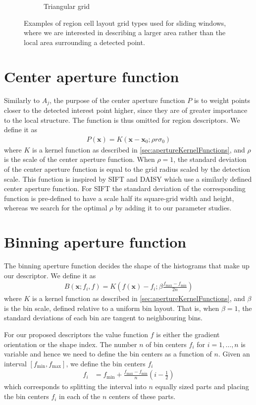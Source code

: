 \documentclass[thesis.tex]{subfiles}
\def\x{\mathbf{x}}
\begin{document}
\begin{figure}[tb]
\begin{subfigure}[t]{0.45\textwidth}
		\caption{Triangular grid}
		\label{fig:gridTypeTriangle}
	\end{subfigure}
	\caption{Examples of region cell layout grid types used for sliding windows, where we are interested in describing a larger area rather than the local area surrounding a detected point.}
\label{fig:gridTypeWindow}
\end{figure}
%
\section{Center aperture function}
\label{sec:centerApertureFunction}
%
Similarly to $A_j$, the purpose of the center aperture function $P$ is to weight points closer to the detected interest point higher, since they are of greater importance to the local structure. The function is thus omitted for region descriptors. We define it as
%
\begin{align}
P(\x) = K(\x - \x_0; \rho r \sigma_0)
\end{align}
%
where $K$ is a kernel function as described in \ref{sec:apertureKernelFunctions}, and $\rho$ is the scale of the center aperture function. When $\rho = 1$, the standard deviation of the center aperture function is equal to the grid radius scaled by the detection scale. This function is inspired by SIFT \cite{lowe2004distinctive} and DAISY \cite{tola2008fast} which use a similarly defined center aperture function. For SIFT the standard deviation of the corresponding function is pre-defined to have a scale half its square-grid width and height, whereas we search for the optimal $\rho$ by adding it to our parameter studies.
%
\section{Binning aperture function}
\label{sec:binningApertureFunction}
%
The binning aperture function decides the shape of the histograms that make up our descriptor. We define it as
\begin{align}
	B(\x; f_i, f) = K \left( f(\x) - f_i; \beta \frac{f_\text{max} - f_\text{min}}{2n} \right)
\end{align}
where $K$ is a kernel function as described in \ref{sec:apertureKernelFunctions}, and $\beta$ is the bin scale, defined relative to a uniform bin layout. That is, when $\beta = 1$, the standard deviations of each bin are tangent to neighbouring bins.

For our proposed descriptors the value function $f$ is either the gradient orientation or the shape index. The number $n$ of bin centers $f_i$ for $i = 1,\hdots,n$ is variable and hence we need to define the bin centers as a function of $n$. Given an interval $[f_\text{min},f_\text{max}]$, we define the bin centers $f_i$
\begin{align}
	\label{eq:binCenters}
	f_i &= f_\text{min} + \frac{f_\text{max}-f_\text{min}}{n} \left(i - \frac{1}{2} \right)
\end{align}
which corresponds to splitting the interval into $n$ equally sized parts and placing the bin centers $f_i$ in each of the $n$ centers of these parts.
\end{document}
